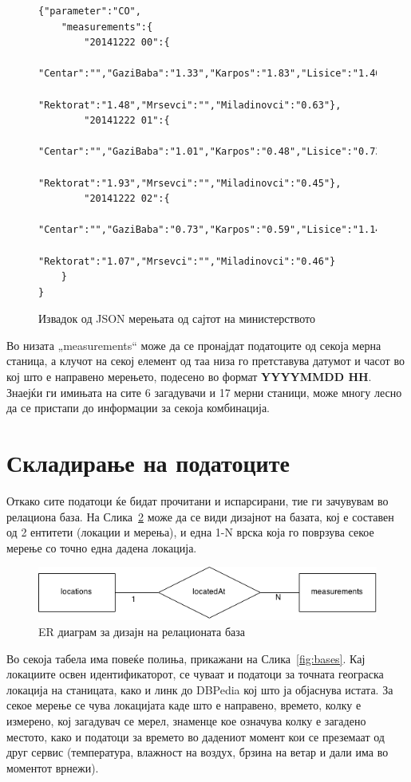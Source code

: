 \documentclass{uvamscse}
\begin{document}
\begin{figure}[H]
\centering
\begin{snippet}
\begin{verbatim}
{"parameter":"CO",
    "measurements":{
        "20141222 00":{
            "Centar":"","GaziBaba":"1.33","Karpos":"1.83","Lisice":"1.40",
            "Rektorat":"1.48","Mrsevci":"","Miladinovci":"0.63"},
        "20141222 01":{
            "Centar":"","GaziBaba":"1.01","Karpos":"0.48","Lisice":"0.73",
            "Rektorat":"1.93","Mrsevci":"","Miladinovci":"0.45"},
        "20141222 02":{
            "Centar":"","GaziBaba":"0.73","Karpos":"0.59","Lisice":"1.14",
            "Rektorat":"1.07","Mrsevci":"","Miladinovci":"0.46"}
    }
}
\end{verbatim}
\end{snippet}
\caption{Извадок од JSON мерењата од сајтот на министерството}
\label{fig:jsonPodatoci}
\end{figure}
\vspace{5mm}

Во низата „measurements“ може да се пронајдат податоците од секоја мерна станица, а клучот на секој елемент од таа низа го претставува датумот и часот во кој што е направено мерењето, подесено во формат \textbf{YYYYMMDD HH}. Знаејќи ги имињата на сите 6 загадувачи и 17 мерни станици, може многу лесно да се пристапи до информации за секоја комбинација.

\section{Складирање на податоците}

Откако сите податоци ќе бидат прочитани и испарсирани, тие ги зачувувам во релациона база. На Слика~\ref{fig:basediagram} може да се види дизајнот на базата, кој е составен од 2 ентитети (локации и мерења), и една 1-N врска која го поврзува секое мерење со точно една дадена локација.

\begin{figure}[H]
  \includegraphics[width=1\textwidth]{figures/basediagram.png}
  \caption{ER диаграм за дизајн на релационата база}
  \label{fig:basediagram}
\end{figure}

Во секоја табела има повеќе полиња, прикажани на Слика~\ref{fig:bases}. Кај локациите освен идентификаторот, се чуваат и податоци за точната геограска локација на станицата, како и линк до DBPedia кој што ја објаснува истата. За секое мерење се чува локацијата каде што е направено, времето, колку е измерено, кој загадувач се мерел, знаменце кое означува колку е загадено местото, како и податоци за времето во дадениот момент кои се преземаат од друг сервис (температура, влажност на воздух, брзина на ветар и дали има во моментот врнежи).
\end{document}
